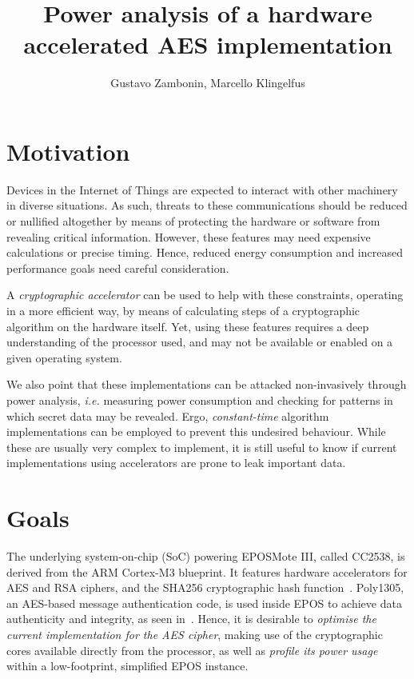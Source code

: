 \documentclass{../sftex/sftex}
\title{Power analysis of a hardware accelerated AES implementation}
\author{Gustavo Zambonin, Marcello Klingelfus}
\begin{document}
\maketitle

\section{Motivation}

Devices in the Internet of Things are expected to interact with other machinery
in diverse situations. As such, threats to these communications should be
reduced or nullified altogether by means of protecting the hardware or software
from revealing critical information. However, these features may need expensive
calculations or precise timing. Hence, reduced energy consumption and increased
performance goals need careful consideration.

A \emph{cryptographic accelerator} can be used to help with these constraints,
operating in a more efficient way, by means of calculating steps of a
cryptographic algorithm on the hardware itself. Yet, using these features
requires a deep understanding of the processor used, and may not be available
or enabled on a given operating system.

We also point that these implementations can be attacked non-invasively through
power analysis, \emph{i.e.} measuring power consumption and checking for
patterns in which secret data may be revealed. Ergo, \emph{constant-time}
algorithm implementations can be employed to prevent this undesired behaviour.
While these are usually very complex to implement, it is still useful to know
if current implementations using accelerators are prone to leak important data.

\section{Goals}

The underlying system-on-chip (SoC) powering EPOSMote III, called CC2538, is
derived from the ARM Cortex-M3 blueprint. It features hardware accelerators for
AES and RSA ciphers, and the SHA256 cryptographic hash
function~\cite{Texas:report:2013:may}. Poly1305, an AES-based message
authentication code, is used inside EPOS to achieve data authenticity and
integrity, as seen in~\cite{Resner:inproc:2015:feb}. Hence, it is desirable to
\emph{optimise the current implementation for the AES cipher}, making use of
the cryptographic cores available directly from the processor, as well as
\emph{profile its power usage} within a low-footprint, simplified EPOS
instance.
\end{document}
